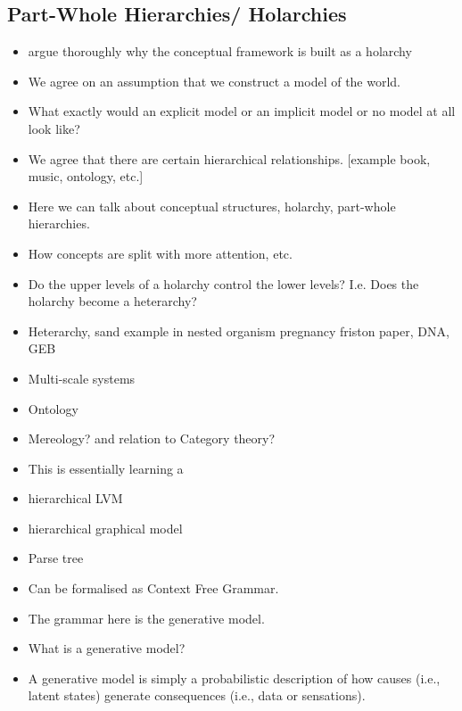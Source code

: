 \subsection{Part-Whole Hierarchies/ Holarchies}
\begin{itemize}
    \item argue thoroughly why the conceptual framework is built as a holarchy
    \item We agree on an assumption that we construct a model of the world.
    \item What exactly would an explicit model or an implicit model or no model at all look like?
    \item We agree that there are certain hierarchical relationships. [example book, music, ontology, etc.]
    \item Here we can talk about conceptual structures, holarchy, part-whole hierarchies. 
    \item How concepts are split with more attention, etc. 
    \item Do the upper levels of a holarchy control the lower levels? I.e. Does the holarchy become a heterarchy?
    \item Heterarchy, sand example in nested organism pregnancy friston paper, DNA, GEB
    \item Multi-scale systems
    \item Ontology
    \item Mereology? and relation to Category theory?
    \item This is essentially learning a 
        \item hierarchical LVM
        \item hierarchical graphical model
        \item Parse tree
        \item Can be formalised as Context Free Grammar. 
        \item The grammar here is the generative model. 
        \item What is a generative model?
        \item A generative model is simply a probabilistic description of how causes (i.e., latent states) generate consequences (i.e., data or sensations). \cite{friston_world_2021}
\end{itemize}


